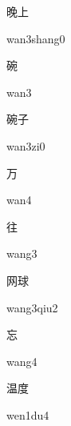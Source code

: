 \begin{multicols*}{2}
\begin{verbete}{晚上}
\begin{pronuncia}{wan3shang0}
\end{pronuncia}
\end{verbete}

\begin{verbete}[wan3]{碗}
\begin{pronuncia}{wan3}
\end{pronuncia}
\end{verbete}

\begin{verbete}[wan3zi0]{碗子}
\begin{pronuncia}{wan3zi0}
\end{pronuncia}
\end{verbete}

\begin{verbete}[wan4]{万}
\begin{pronuncia}{wan4}
\end{pronuncia}
\end{verbete}

\begin{verbete}[wang3]{往}
\begin{pronuncia}{wang3}
\end{pronuncia}
\end{verbete}

\begin{verbete}{网球}
\begin{pronuncia}{wang3qiu2}
\end{pronuncia}
\end{verbete}

\begin{verbete}[wang4]{忘}
\begin{pronuncia}{wang4}
\end{pronuncia}
\end{verbete}

\begin{verbete}[wen1du4]{温度}
\begin{pronuncia}{wen1du4}
\end{pronuncia}
\end{verbete}


\end{multicols*}

